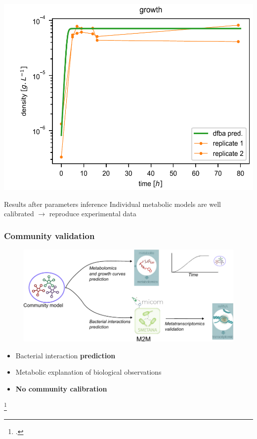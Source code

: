 \documentclass[8pt,usenames,dvipsnames]{beamer}
\begin{document}
\begin{frame}
\begin{minipage}{0.5\textwidth}
\includegraphics[width=\textwidth]{figures/validation-ll.pdf}
\end{minipage}%
\hspace{0.3cm}
\hfill
\begin{minipage}{0.4\textwidth}
\begin{block}{Results after parameters inference}
Individual metabolic models are well calibrated $\rightarrow$ reproduce experimental data
\end{block}

\end{minipage}

\end{frame}

\begin{frame}
\frametitle{Community validation}

\begin{figure}
\includegraphics[width=\textwidth]{figures/com-validation.pdf}
\end{figure}
\begin{block}{}
\begin{itemize}
\item Bacterial interaction \textbf{prediction}
\item Metabolic explanation of biological observations
\item \textbf{No community calibration}
\end{itemize}
\end{block}
\footcite{Cao2021}

\end{frame}
\end{document}
